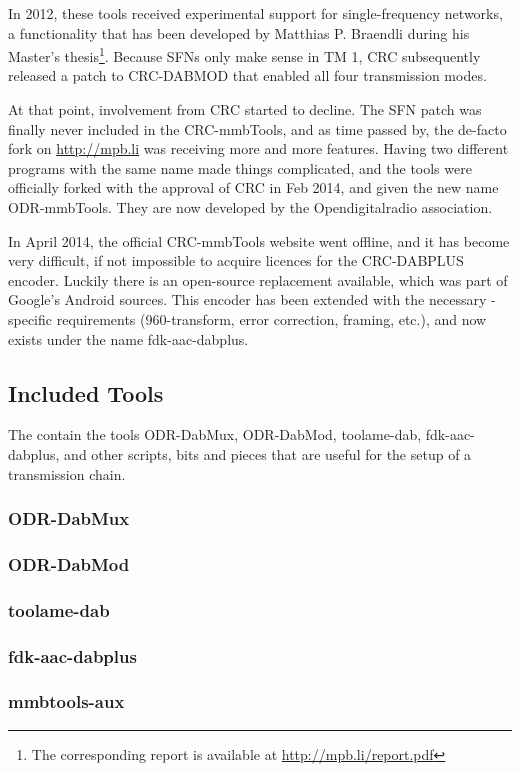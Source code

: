 In 2012, these tools received experimental support for single-frequency
networks, a functionality that has been developed by Matthias P. Braendli during
his Master's thesis\footnote{The corresponding report is available at
    \url{http://mpb.li/report.pdf}}.
Because SFNs only make sense in TM 1, CRC subsequently released a patch to
\mbox{CRC-DABMOD} that enabled all four transmission modes.

At that point, involvement from CRC started to decline. The SFN patch was
finally never included in the \mbox{CRC-mmbTools}, and as time passed by, the
de-facto fork on \url{http://mpb.li} was receiving more and more features.
Having two different programs with the same name made things complicated, and
the tools were officially forked with the approval of CRC in Feb 2014, and given
the new name \mbox{ODR-mmbTools}. They are now developed by the Opendigitalradio
association.

In April 2014, the official \mbox{CRC-mmbTools} website went offline, and it has
become very difficult, if not impossible to acquire licences for the
\mbox{CRC-DABPLUS} encoder. Luckily there is an open-source replacement
available, which was part of Google's Android sources. This encoder has been
extended with the necessary \dabplus{}-specific requirements (960-transform,
error correction, framing, etc.), and now exists under the name
\mbox{fdk-aac-dabplus}.

\subsection{Included Tools}
The \mmbtools contain the tools \mbox{ODR-DabMux}, \mbox{ODR-DabMod},
\mbox{toolame-dab}, \mbox{fdk-aac-dabplus}, and other scripts, bits and pieces
that are useful for the setup of a transmission chain.

\subsubsection{ODR-DabMux}
\subsubsection{ODR-DabMod}
\subsubsection{toolame-dab}
\subsubsection{fdk-aac-dabplus}
\subsubsection{mmbtools-aux}



